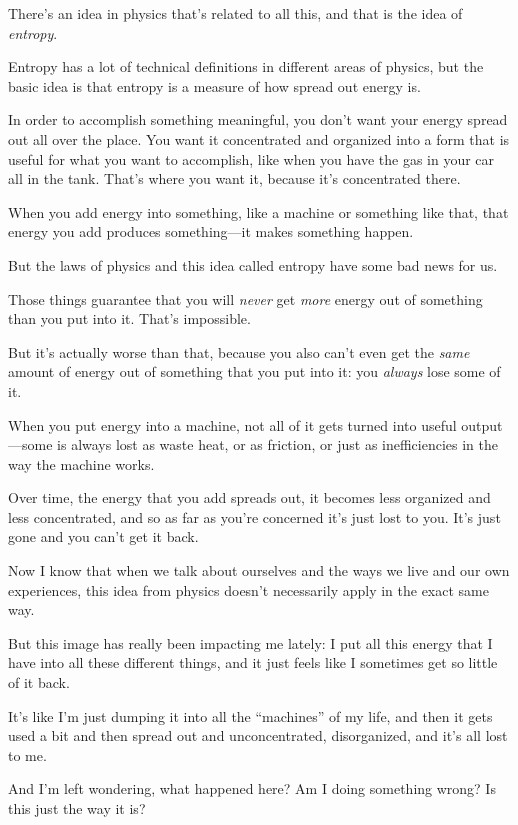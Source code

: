 \begin{compactitem}
			\item There's an idea in physics that's related to all this, and that is the idea of \textit{entropy}.
				\begin{compactitem}
					\item Entropy has a lot of technical definitions in different areas of physics, but the basic idea is that entropy is a measure of how spread out energy is.
					\item In order to accomplish something meaningful, you don't want your energy spread out all over the place. You want it concentrated and organized into a form that is useful for what you want to accomplish, like when you have the gas in your car all in the tank. That's where you want it, because it's concentrated there.
					\item When you add energy into something, like a machine or something like that, that energy you add produces something---it makes something happen.
					\item But the laws of physics and this idea called entropy have some bad news for us.
					\item Those things guarantee that you will \textit{never} get \textit{more} energy out of something than you put into it. That's impossible.
					\item But it's actually worse than that, because you also can't even get the \textit{same} amount of energy out of something that you put into it: you \textit{always} lose some of it.
					\item When you put energy into a machine, not all of it gets turned into useful output---some is always lost as waste heat, or as friction, or just as inefficiencies in the way the machine works.
					\item Over time, the energy that you add spreads out, it becomes less organized and less concentrated, and so as far as you're concerned it's just lost to you. It's just gone and you can't get it back.
					\item Now I know that when we talk about ourselves and the ways we live and our own experiences, this idea from physics doesn't necessarily apply in the exact same way.
					\item But this image has really been impacting me lately: I put all this energy that I have into all these different things, and it just feels like I sometimes get so little of it back.
					\item It's like I'm just dumping it into all the ``machines'' of my life, and then it gets used a bit and then spread out and unconcentrated, disorganized, and it's all lost to me.
					\item And I'm left wondering, what happened here? Am I doing something wrong? Is this just the way it is? 
				\end{compactitem}
				

\end{compactitem}
